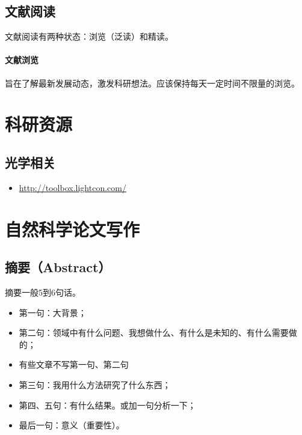 \subsection{文献阅读}
文献阅读有两种状态：浏览（泛读）和精读。

\paragraph{文献浏览}旨在了解最新发展动态，激发科研想法。应该保持每天一定时间不限量的浏览。






\section{科研资源}
\subsection{光学相关}
 \begin{itemize}
\item \url{http://toolbox.lightcon.com/}
\end{itemize}


\section{自然科学论文写作}
\subsection{摘要（Abstract）}
摘要一般5到6句话。
\begin{itemize}
\item 第一句：大背景；
\item 第二句：领域中有什么问题、我想做什么、有什么是未知的、有什么需要做的；
\item 有些文章不写第一句、第二句
\item 第三句：我用什么方法研究了什么东西；
\item 第四、五句：有什么结果。或加一句分析一下；
\item 最后一句：意义（重要性）。
\end{itemize}


